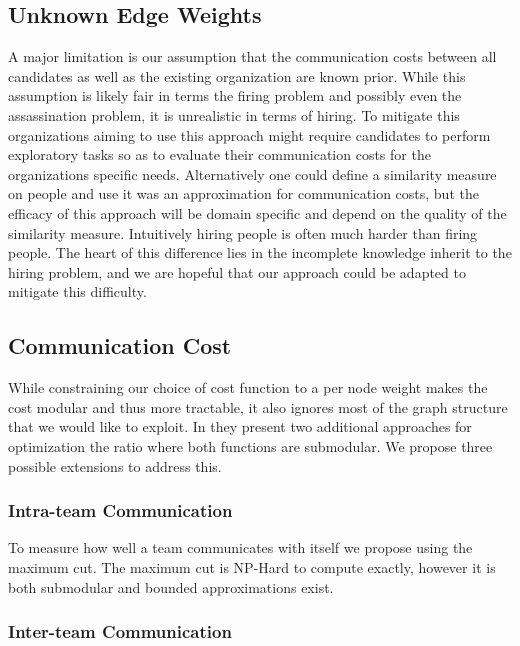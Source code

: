 \subsection{Unknown Edge Weights}

A major limitation is our assumption that the communication costs between all candidates as well as the existing organization are known prior. While this assumption is likely fair in terms the firing problem and possibly even the assassination problem, it is unrealistic in terms of hiring. To mitigate this organizations aiming to use this approach might require candidates to perform exploratory tasks so as to evaluate their communication costs for the organizations specific needs. Alternatively one could define a similarity measure on people and use it was an approximation for communication costs, but the efficacy of this approach will be domain specific and depend on the quality of the similarity measure. Intuitively hiring people is often much harder than firing people. The heart of this difference lies in the incomplete knowledge inherit to the hiring problem, and we are hopeful that our approach could be adapted to mitigate this difficulty. 

\subsection{Communication Cost}

While constraining our choice of cost function to a per node weight makes the cost modular and thus more tractable, it also ignores most of the graph structure that we would like to exploit. In \cite{bai2016algorithms} they present two additional approaches for optimization the ratio where both functions are submodular. We propose three possible extensions to address this. 

\subsubsection{Intra-team Communication}

To measure how well a team communicates with itself we propose using the maximum cut. The maximum cut is NP-Hard to compute exactly, however it is both submodular and bounded approximations exist. 

\subsubsection{Inter-team Communication}

